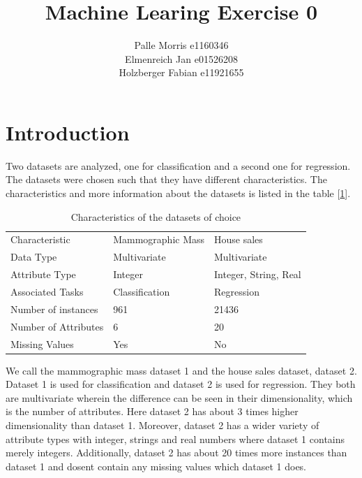 \documentclass[11pt]{article}
\begin{document}
\graphicspath{{./figures/}}
\author{Palle Morris e1160346\\ Elmenreich Jan e01526208\\ Holzberger Fabian e11921655 }
\title{Machine Learing Exercise 0}
\maketitle



\section{Introduction}
Two datasets are analyzed, one for classification and a second one for regression. The datasets were chosen such that they have different characteristics. The characteristics and more information about the datasets is listed in the table [\ref{tab:char1}].
\begin{table}[H]
\begin{tabularx}{1.0\linewidth}{XXX}
\hline
Characteristic 		& Mammographic Mass 	& House sales   \\
Data Type 		& Multivariate 	& Multivariate \\
Attribute Type  	& Integer  & Integer, String, Real\\
Associated Tasks	& Classification & Regression \\
Number of instances     & 961 		 & 21436\\
Number of Attributes    & 6 		& 20\\
Missing Values 		& Yes 		& No \\
\hline
\end{tabularx}
\label{tab:char1}
\caption{Characteristics of the datasets of choice}
\end{table}

We call the mammographic mass dataset 1 and the house sales dataset, dataset 2. Dataset 1 is used for classification and dataset 2 is used for regression. They both are multivariate wherein the difference can be seen in their dimensionality, which is the number of attributes. Here dataset 2 has about 3 times higher dimensionality than dataset 1. Moreover, dataset 2 has a wider variety of attribute types with integer, strings and real numbers where dataset 1 contains merely integers. Additionally, dataset 2 has about 20 times more instances than dataset 1 and dosent contain any missing values which dataset 1 does.

\end{document}
